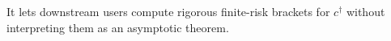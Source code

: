 It lets downstream users compute rigorous finite-risk brackets for \(c^\dagger\) without interpreting them as an asymptotic theorem.